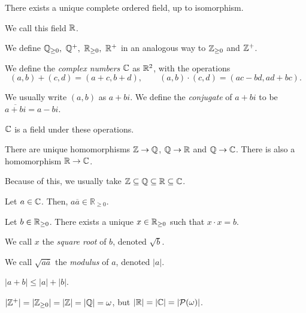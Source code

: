   \begin{thm}
    There exists a unique complete ordered field, up to isomorphism.
  \end{thm}
  \begin{defn}
    We call this field $\mathbb{R}$.
  \end{defn}
  \begin{defn}
    We define $\mathbb{Q}_{\ge 0},\ \mathbb{Q}^+,\ \mathbb{R}_{\ge 0},\ \mathbb{R}^+$ in an analogous way to
    $\mathbb{Z}_{\ge 0}$ and $\mathbb{Z}^+$.
  \end{defn}
  \begin{defn}
    We define the \emph{complex numbers} $\mathbb{C}$ as $\mathbb{R}^2$, with the operations
    \[(a,b)+(c,d)=(a+c,b+d),\qquad (a,b)\cdot(c,d)=(ac-bd,ad+bc).\]

    We usually write $(a,b)$ as $a+bi$. We define the \emph{conjugate} of $a+bi$
    to be $\overline{a+bi}=a-bi$.
  \end{defn}
  \begin{prop}
    $\mathbb{C}$ is a field under these operations.
  \end{prop}
  \begin{prop}
    There are unique homomorphisms $\mathbb{Z}\to\mathbb{Q}$, $\mathbb{Q}\to\mathbb{R}$ and $\mathbb{Q}\to\mathbb{C}$.
    There is also a homomorphism $\mathbb{R}\to\mathbb{C}$.
  \end{prop}
  \begin{rem}
    Because of this, we usually take $\mathbb{Z}\subseteq\mathbb{Q}\subseteq\mathbb{R}\subseteq\mathbb{C}$.
  \end{rem}
  \begin{prop}
    Let $a\in\mathbb{C}$. Then, $a\overline{a}\in\mathbb R_{\ge 0}$.
  \end{prop}
  \begin{prop}
    Let $b\in\mathbb{R}_{\ge 0}$. There exists a unique $x\in\mathbb{R}_{\ge 0}$ such that
    $x\cdot x=b$. 
  \end{prop}
  \begin{defn}
    We call $x$ the \emph{square root} of $b$, denoted $\sqrt b$.

    We call $\sqrt{a\overline a}$ the \emph{modulus} of $a$, denoted $|a|$.
  \end{defn}
  \begin{prop}
    $|a+b|\le|a|+|b|$.
  \end{prop}
  \begin{thm}
    $|\mathbb{Z}^+|=|\mathbb{Z}_{\ge 0}|=|\mathbb{Z}|=|\mathbb{Q}|=\omega$, but $|\mathbb{R}|=|\mathbb{C}|=|\mathcal
    P(\omega)|$.
  \end{thm}
